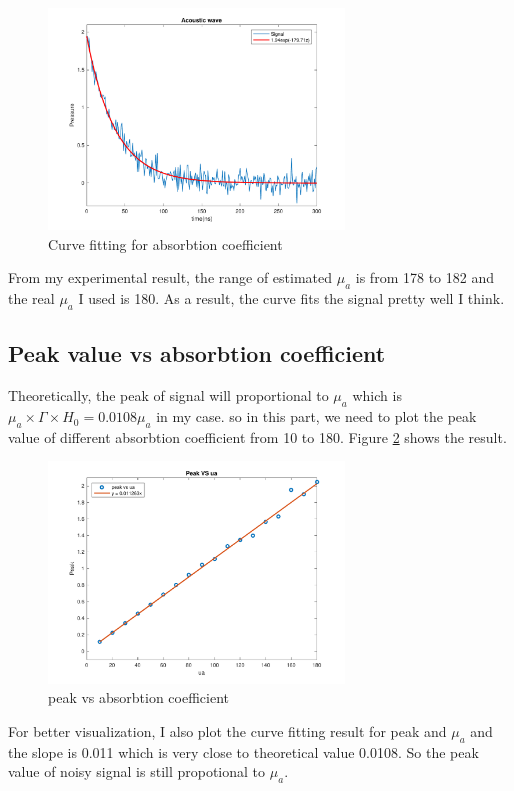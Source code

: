 \documentclass{article}
\begin{document}
\begin{figure}[H]
    \centering
    \includegraphics[width=0.7\textwidth]{src/p1c.pdf}
    \caption{Curve fitting for absorbtion coefficient}
    \label{fig:p1c}
\end{figure}

From my experimental result, the range of estimated $\mu_a$ is from 178 to 182 and the real $\mu_a$ I used is 180. 
As a result, the curve fits the signal pretty well I think.


\subsection{Peak value vs absorbtion coefficient}
\label{sec:p1d}
Theoretically, the peak of signal will proportional to $\mu_a$ which is $\mu_a \times \Gamma \times H_0 = 0.0108\mu_a$ in my case. 
so in this part, we need to plot the peak value of different absorbtion coefficient from 10 to 180. Figure \ref{fig:p1d} 
shows the result.
\begin{figure}[H]
    \centering
    \includegraphics[width=0.7\textwidth]{src/p1d.pdf}
    \caption{peak vs absorbtion coefficient}
    \label{fig:p1d}
\end{figure}
For better visualization, I also plot the curve fitting result for peak and $\mu_a$ and the slope is 0.011 which is very close to
theoretical value 0.0108. So the peak value of noisy signal is still propotional to $\mu_a$.
\end{document}
